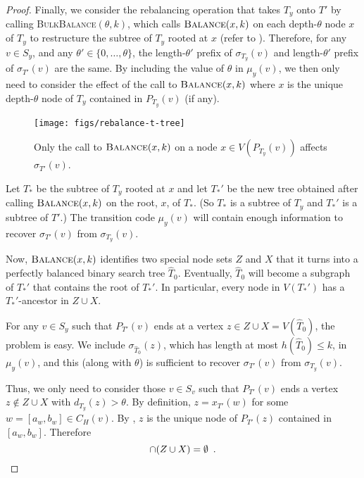 \documentclass[kpfonts]{patmorin}
\let\le\leqslant
\begin{document}
\begin{proof}
  Finally, we consider the rebalancing operation that takes $T_y$ onto $T'$ by calling \textsc{BulkBalance}$(\theta,k)$, which calls $\textsc{Balance}(x,k)$ on each depth-$\theta$ node $x$ of $T_y$ to restructure the subtree of $T_y$ rooted at $x$ (refer to ). Therefore, for any $v\in S_y$, and any $\theta'\in\{0,\ldots,\theta\}$, the length-$\theta'$ prefix of $\sigma_{T_y}(v)$ and length-$\theta'$ prefix of $\sigma_{T'}(v)$ are the same.  By including the value of $\theta$ in $\mu_y(v)$, we then only need to consider the effect of the call to $\textsc{Balance}(x,k)$ where $x$ is the unique depth-$\theta$ node of $T_y$ contained in $P_{T_y}(v)$ (if any).

  \begin{figure}
    \begin{center}
      \texttt{[image: figs/rebalance-t-tree]}
    \end{center}
    \caption{Only the call to $\textsc{Balance}(x,k)$ on a node $x\in V(P_{T_y}(v))$ affects $\sigma_{T'}(v)$.}
  \end{figure}

  Let $T_*$ be the subtree of $T_y$ rooted at $x$ and let $T_*'$ be the new tree obtained after calling $\textsc{Balance}(x,k)$ on the root, $x$, of $T_*$. (So $T_*$ is a subtree of $T_y$ and $T_*'$ is a subtree of $T'$.)
  The transition code $\mu_y(v)$ will contain enough information to recover $\sigma_{T'}(v)$ from $\sigma_{T_y}(v)$.

  Now, $\textsc{Balance}(x,k)$ identifies two special node sets $Z$ and $X$ that it turns into a perfectly balanced binary search tree $\hat{T}_0$.  Eventually, $\hat{T}_0$ will become a subgraph of $T_*'$ that contains the root of $T_*'$.   In particular, every node in $V(T_*')$ has a $T_*'$-ancestor in $Z\cup X$.

  For any $v\in S_y$ such that $P_{T'}(v)$ ends at a vertex $z\in Z\cup X=V(\hat{T}_0)$, the problem is easy.  We include $\sigma_{\hat{T}_0}(z)$, which has length at most $h(\hat{T}_0)\le k$, in $\mu_y(v)$, and this (along with $\theta$) is sufficient to recover $\sigma_{T'}(v)$ from $\sigma_{T_y}(v)$.

  Thus, we only need to consider those $v\in S_v$ such that $P_{T'}(v)$ ends a vertex $z\not\in Z\cup X$ with $d_{T_y}(z)>\theta$.    By definition,  $z=x_{T'}(w)$ for some $w=[a_w,b_w]\in C_H(v)$.  By , $z$ is the unique node of $P_{T'}(z)$ contained in $[a_w,b_w]$.  Therefore
  \begin{equation}
    [a_w,b_w]\cap (Z\cup X)=\emptyset \enspace . \eqlabel{empty}
  \end{equation}


\end{proof}
\end{document}
